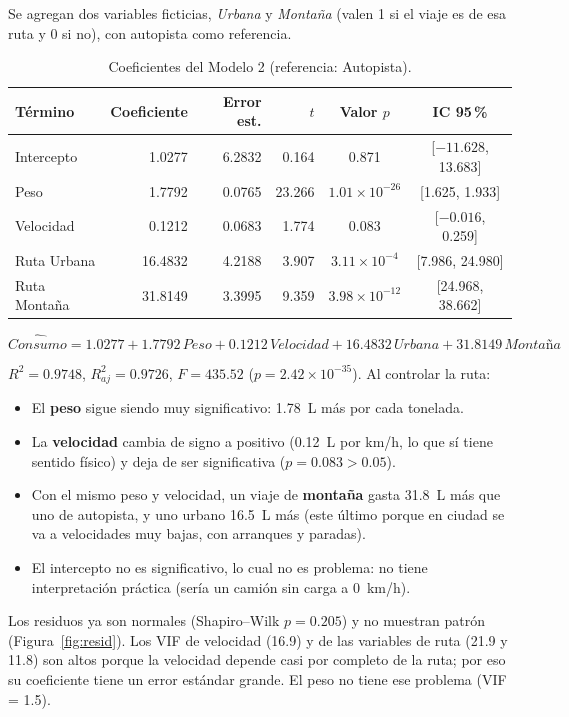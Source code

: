 \documentclass[12pt,letterpaper]{article}
\begin{document}
Se agregan dos variables ficticias, \emph{Urbana} y \emph{Montaña} (valen 1 si el viaje es de esa ruta y 0 si no), con autopista como referencia.

\begin{table}[H]
\centering
\caption{Coeficientes del Modelo 2 (referencia: Autopista).}
\label{tab:m2}
\begin{tabular}{lrrrcc}
\toprule
Término & Coeficiente & Error est. & $t$ & Valor $p$ & IC 95\,\% \\
\midrule
Intercepto    &  1.0277 & 6.2832 & 0.164  & 0.871                  & [$-11.628$, 13.683] \\
Peso          &  1.7792 & 0.0765 & 23.266 & $1.01 \times 10^{-26}$ & [1.625, 1.933] \\
Velocidad     &  0.1212 & 0.0683 & 1.774  & 0.083                  & [$-0.016$, 0.259] \\
Ruta Urbana   & 16.4832 & 4.2188 & 3.907  & $3.11 \times 10^{-4}$  & [7.986, 24.980] \\
Ruta Montaña  & 31.8149 & 3.3995 & 9.359  & $3.98 \times 10^{-12}$ & [24.968, 38.662] \\
\bottomrule
\end{tabular}
\end{table}

$$ \widehat{Consumo} = 1.0277 + 1.7792\,Peso + 0.1212\,Velocidad + 16.4832\,Urbana + 31.8149\,Montaña $$

$R^2 = 0.9748$, $R^2_{aj} = 0.9726$, $F = 435.52$ ($p = 2.42 \times 10^{-35}$). Al controlar la ruta:
\begin{itemize}[itemsep=2pt]
  \item El \textbf{peso} sigue siendo muy significativo: 1.78~L más por cada tonelada.
  \item La \textbf{velocidad} cambia de signo a positivo (0.12~L por km/h, lo que sí tiene sentido físico) y deja de ser significativa ($p = 0.083 > 0.05$).
  \item Con el mismo peso y velocidad, un viaje de \textbf{montaña} gasta 31.8~L más que uno de autopista, y uno urbano 16.5~L más (este último porque en ciudad se va a velocidades muy bajas, con arranques y paradas).
  \item El intercepto no es significativo, lo cual no es problema: no tiene interpretación práctica (sería un camión sin carga a 0~km/h).
\end{itemize}

Los residuos ya son normales (Shapiro--Wilk $p = 0.205$) y no muestran patrón (Figura~\ref{fig:resid}). Los VIF de velocidad (16.9) y de las variables de ruta (21.9 y 11.8) son altos porque la velocidad depende casi por completo de la ruta; por eso su coeficiente tiene un error estándar grande. El peso no tiene ese problema (VIF = 1.5).
\end{document}
